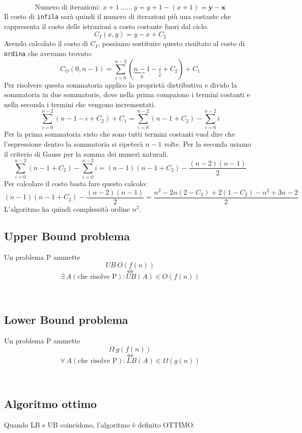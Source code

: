 $$\text{Numero di iterazioni} :\ x+1\ \dots \dots \ y = y+1-(x+1) = \bm{y-x}$$
Il costo di \texttt{infila} sarà quindi il numero di iterazioni più una costante che rappresenta il costo delle istruzioni a costo costante fuori dal ciclo. 
$$C_I (x,y) = y - x + C_2$$
Avendo calcolato il costo di $C_I$, possiamo sostituire questo risultato al costo di \texttt{ordina} che avevamo trovato:
$$C_O(0, n-1) = \sum_{i =0}^{n-2}{(\underbrace{n-1}_{y}-\underbrace{i}_{x}+C_2)} + C_1$$
Per risolvere questa sommatoria applico la proprietà distributiva e divido la sommatoria in due sommatorie, dove nella prima compaiono i termini costanti e nella seconda i termini che vengono incrementati.
$$\sum_{i =0}^{n-2}{(n-1-i+C_2)} + C_1 = \sum_{i =0}^{n-2} (n-1+C_2) - \sum_{i=0}^{n-2}i$$
Per la prima sommatoria visto che sono tutti termini costanti vuol dire che l'espressione dentro la sommatoria si ripeterà $n-1$ volte. Per la seconda usiamo il criterio di Gauss per la somma dei numeri naturali.
$$ \sum_{i =0}^{n-2} (n-1+C_2) - \sum_{i=0}^{n-2}i = (n-1)(n-1+C_2) -\frac{(n-2)(n-1)}{2}$$
Per calcolare il costo basta fare questo calcolo:
$$ (n-1)(n-1+C_2) -\frac{(n-2)(n-1)}{2} = \frac{n^2 - 2n(2-C_2)+2(1-C_2)-n^2+3n-2}{2}$$
L'algoritmo ha quindi complessità ordine $n^2$.

\subsection{\texorpdfstring{Upper Bound problema}{Upper Bound problema}}
\colorbox{SALZO}{\parbox{\dimexpr\linewidth-2\fboxsep}{\begin{definition}
    Un problema P ammette\\
    $$UB \  O(f(n))$$
    $$\Leftrightarrow$$
    $$\exists\  A(\text{che risolve P}):UB(A) \in O(f(n))$$
\end{definition}}}\medskip\\ 
\subsection{\texorpdfstring{Lower Bound problema}{Lower Bound problema}}
\colorbox{SALZO}{\parbox{\dimexpr\linewidth-2\fboxsep}{\begin{definition}
    Un problema P ammette\\
    $$\Omega \  g(f(n))$$
    $$\Leftrightarrow$$
    $$\forall \ A(\text{che risolve P}): LB(A) \in \Omega(g(n))$$
\end{definition}}}\medskip\\ 
\subsection{\texorpdfstring{Algoritmo ottimo}{Algoritmo ottimo}}
\colorbox{SALZO}{\parbox{\dimexpr\linewidth-2\fboxsep}{\begin{definition}
Quando LB e UB coincidono, l'algoritmo è definito OTTIMO.
\end{definition}}} 





